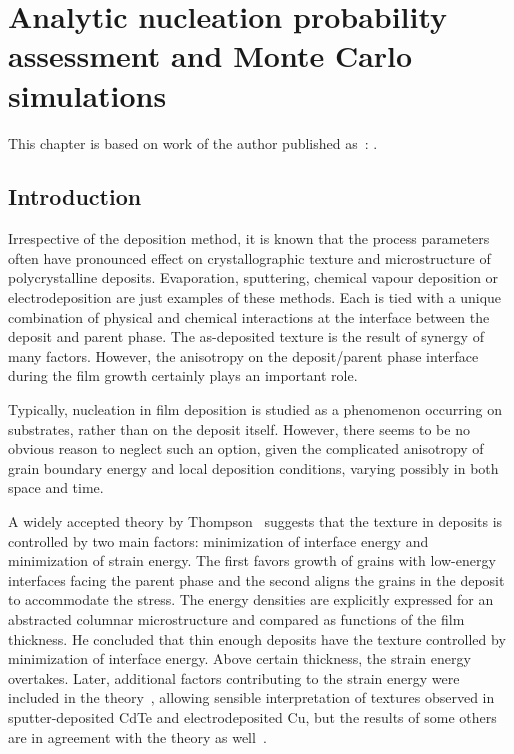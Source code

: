 \chapter{Analytic nucleation probability assessment and Monte Carlo simulations}\label{ch_paper2}
This chapter is based on work of the author published as~\cite{Minar2024}: .

\section{Introduction}
\label{sec_Intro}
Irrespective of the deposition method, it is known that the process parameters often have pronounced effect on crystallographic texture and microstructure of polycrystalline deposits. Evaporation, sputtering, chemical vapour deposition or electrodeposition are just examples of these methods. Each is tied with a unique combination of physical and chemical interactions at the interface between the deposit and parent phase. The as-deposited texture is the result of synergy of many factors. However, the anisotropy on the deposit/parent phase interface during the film growth certainly plays an important role. 

Typically, nucleation in film deposition is studied as a phenomenon occurring on substrates, rather than on the deposit itself. However, there seems to be no obvious reason to neglect such an option, given the complicated anisotropy of grain boundary energy and local deposition conditions, varying possibly in both space and time. 

A widely accepted theory by Thompson~\cite{Thompson1993} suggests that the texture in deposits is controlled by two main factors: minimization of interface energy and minimization of strain energy. The first favors growth of grains with low-energy interfaces facing the parent phase and the second aligns the grains in the deposit to accommodate the stress. The energy densities are explicitly expressed for an abstracted columnar microstructure and compared as functions of the film thickness. He concluded that thin enough deposits have the texture controlled by minimization of interface energy. Above certain thickness, the strain energy overtakes. Later, additional factors contributing to the strain energy were included in the theory~\cite{Consonni2008}, allowing sensible interpretation of textures observed in sputter-deposited CdTe and electrodeposited Cu, but the results of some others are in agreement with the theory as well~\cite{SonnweberRibic2006, Sanchez1992}. 

